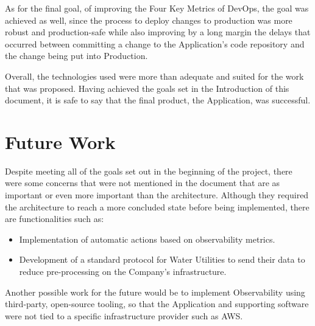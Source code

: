 As for the final goal, of improving the Four Key Metrics of DevOps, the goal was achieved as well, since the process to deploy changes to production was more robust and production-safe while also improving by a long margin the delays that occurred between committing a change to the Application's code repository and the change being put into Production. 

Overall, the technologies used were more than adequate and suited for the work that was proposed. Having achieved the goals set in the Introduction of this document, it is safe to say that the final product, the Application, was successful.

\section{Future Work}\label{conclusion:s:future-work}

Despite meeting all of the goals set out in the beginning of the project, there were some concerns that were not mentioned in the document that are as important or even more important than the architecture. 
Although they required the architecture to reach a more concluded state before being implemented, there are functionalities such as:

\begin{itemize}
    \item Implementation of automatic actions based on observability metrics.
    \item Development of a standard protocol for Water Utilities to send their data to reduce pre-processing on the Company's infrastructure.
\end{itemize}

Another possible work for the future would be to implement Observability using third-party, open-source tooling, so that the Application and supporting software were not tied to a specific infrastructure provider such as AWS. 